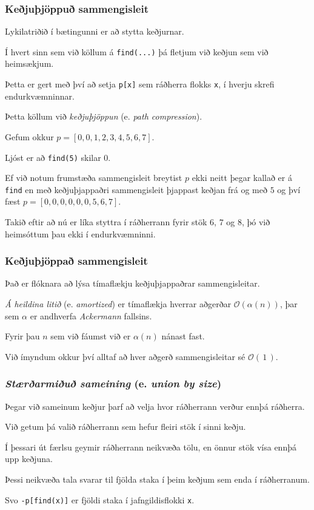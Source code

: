 {
	\frametitle{Keðjuþjöppuð sammengisleit}
	{
		\item<1-> Lykilatriðið í bætingunni er að stytta keðjurnar.
		\item<2-> Í hvert sinn sem við köllum á \texttt{find(...)} þá fletjum við keðjun sem við heimsækjum.
		\item<3-> Þetta er gert með því að setja \texttt{p[x]} sem ráðherra flokks \texttt{x}, í hverju skrefi endurkvæmninnar.
		\item<4-> Þetta köllum við \emph{keðjuþjöppun} (e. \emph{path compression}).
	}
}

{
	{
		\item<1-> Gefum okkur
			$p = [0, 0, 1, 2, 3, 4, 5, 6, 7]$.
		\item<2-> Ljóst er að \texttt{find(5)} skilar $0$.
		\item<3-> Ef við notum frumstæða sammengisleit breytist $p$ ekki neitt þegar kallað er á \texttt{find}
			en með keðjuþjappaðri sammengisleit þjappast keðjan frá og með $5$ og því fæst
			$p = [0, 0, 0, 0, 0, 0, 5, 6, 7]$.
		\item<4-> Takið eftir að nú er líka styttra í ráðherrann fyrir stök $6$, $7$ og $8$, þó við heimsóttum þau ekki í endurkvæmninni.
	}
}

{
	\frametitle{Keðjuþjöppað sammengisleit}
}

{
	{
		\item<1-> Það er flóknara að lýsa tímaflækju keðjuþjappaðrar sammengisleitar.
		\item<2-> \emph{Á heildina litið} (e. \emph{amortized}) er tímaflækja hverrar aðgerðar $\mathcal{O}(\alpha(n))$,
					þar sem $\alpha$ er andhverfa \emph{Ackermann} fallsins.
		\item<3-> Fyrir þau $n$ sem við fáumst við er $\alpha(n)$ nánast fast.
		\item<4-> Við ímyndum okkur því alltaf að hver aðgerð sammengisleitar sé $\mathcal{O}(\,1\,)$.
	}
}

{
	\frametitle{\emph{Stærðarmiðuð sameining} (e. \emph{union by size})}
	{
		\item<1-> Þegar við sameinum keðjur þarf að velja hvor ráðherrann verður ennþá ráðherra.
		\item<2-> Við getum þá valið ráðherrann sem hefur fleiri stök í sinni keðju.
		\item<3->[] 
		\item<4-> Í þessari út færlsu geymir ráðherrann neikvæða tölu, en önnur stök vísa ennþá upp keðjuna.
		\item<5-> Þessi neikvæða tala svarar til fjölda staka í þeim keðjum sem enda í ráðherranum.
		\item<6-> Svo \texttt{-p[find(x)]} er fjöldi staka í jafngildisflokki \texttt{x}.
	}
}

{
}



